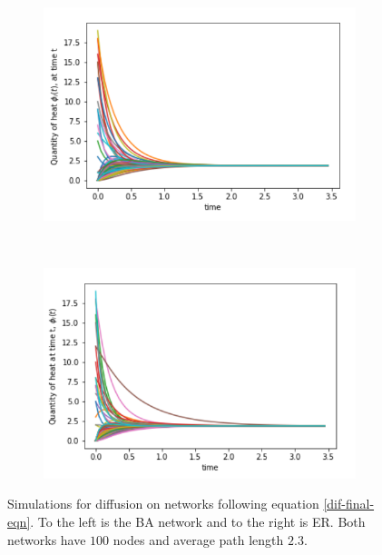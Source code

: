\documentclass[10pt,a4paper]{article}
\begin{document}
     \begin{figure}[H]
     	\centering
     	\begin{subfigure}[b]{0.45\textwidth}
     		\includegraphics[width=\textwidth]{images/Barabasi-normalDiffusion.png}
     		\caption{}
     		\label{barabasi-normal}
     	\end{subfigure}~
     	\begin{subfigure}[b]{0.45\textwidth}
     		\includegraphics[width= \textwidth]{images/E-R-normalDiffusion.png}
     		\caption{}
     		\label{ER-normal}
     	\end{subfigure}
        \caption{Simulations for diffusion on networks following equation \ref{dif-final-eqn}. To the left is the BA network and to the right is ER. Both networks have $100$ nodes and average path length $2.3$. }
     	\label{barabasi-Erdos-compare}
     \end{figure}
\end{document}
